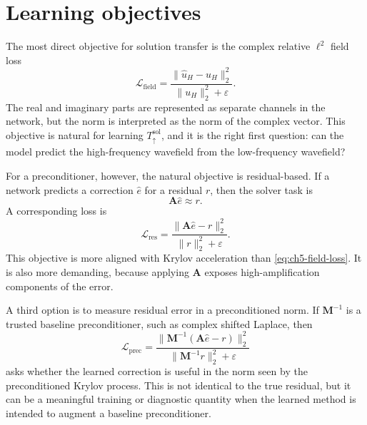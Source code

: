 \section{Learning objectives}
\label{sec:ch5-objectives}

The most direct objective for solution transfer is the complex relative
$\ell^2$ field loss
\begin{equation}
    \mathcal{L}_{\mathrm{field}}
    =
    \frac{\|\hat{u}_H-u_H\|_2^2}
         {\|u_H\|_2^2+\varepsilon}.
    \label{eq:ch5-field-loss}
\end{equation}
The real and imaginary parts are represented as separate channels in the
network, but the norm is interpreted as the norm of the complex vector. This
objective is natural for learning $T_{\uparrow}^{\mathrm{sol}}$, and it is the
right first question: can the model predict the high-frequency wavefield from
the low-frequency wavefield?

For a preconditioner, however, the natural objective is residual-based. If a
network predicts a correction $\hat{e}$ for a residual $r$, then the solver
task is
\begin{equation}
    \mathbf{A}\hat{e}
    \approx
    r.
\end{equation}
A corresponding loss is
\begin{equation}
    \mathcal{L}_{\mathrm{res}}
    =
    \frac{\|\mathbf{A}\hat{e}-r\|_2^2}
         {\|r\|_2^2+\varepsilon}.
    \label{eq:ch5-residual-loss}
\end{equation}
This objective is more aligned with Krylov acceleration than
\eqref{eq:ch5-field-loss}. It is also more demanding, because applying
$\mathbf{A}$ exposes high-amplification components of the error.

A third option is to measure residual error in a preconditioned norm. If
$\mathbf{M}^{-1}$ is a trusted baseline preconditioner, such as complex
shifted Laplace, then
\begin{equation}
    \mathcal{L}_{\mathrm{prec}}
    =
    \frac{\|\mathbf{M}^{-1}(\mathbf{A}\hat{e}-r)\|_2^2}
         {\|\mathbf{M}^{-1}r\|_2^2+\varepsilon}
    \label{eq:ch5-preconditioned-residual-loss}
\end{equation}
asks whether the learned correction is useful in the norm seen by the
preconditioned Krylov process. This is not identical to the true residual, but
it can be a meaningful training or diagnostic quantity when the learned method
is intended to augment a baseline preconditioner.

